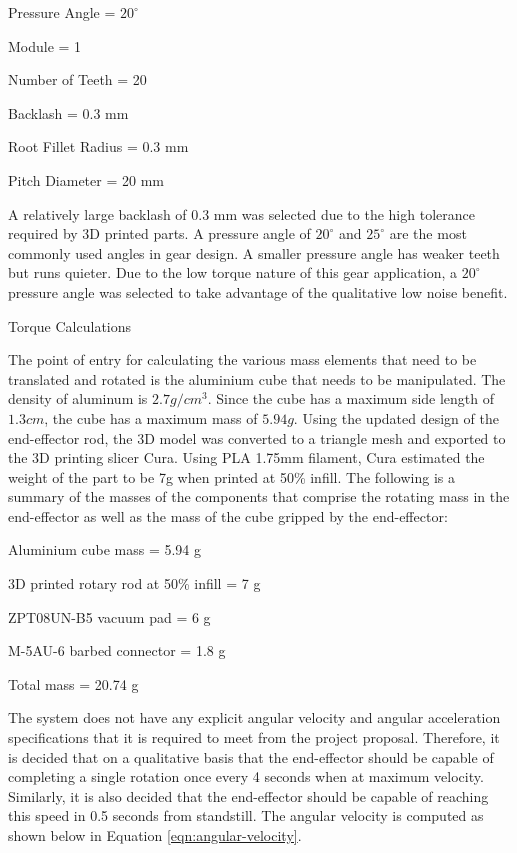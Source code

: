\begin{compactitem}
	\item Pressure Angle = $20 ^\circ$
	\item Module = 1
	\item Number of Teeth = 20
	\item Backlash = 0.3 mm
	\item Root Fillet Radius = 0.3 mm
	\item Pitch Diameter = 20 mm
\end{compactitem}

A relatively large backlash of 0.3 mm was selected due to the high tolerance required by 3D printed parts. A pressure angle of $20 ^\circ$ and $25 ^\circ$ are the most commonly used angles in gear design. A smaller pressure angle has weaker teeth but runs quieter. Due to the low torque nature of this gear application, a $20 ^\circ$ pressure angle was selected to take advantage of the qualitative low noise benefit.

Torque Calculations

The point of entry for calculating the various mass elements that need to be translated and rotated is the aluminium cube that needs to be manipulated. The density of aluminum is $2.7 g/cm^3$. Since the cube has a maximum side length of $1.3 cm$, the cube has a maximum mass of $5.94 g$. Using the updated design of the end-effector rod, the 3D model was converted to a triangle mesh and exported to the 3D printing slicer Cura. Using PLA 1.75mm filament, Cura estimated the weight of the part to be 7g when printed at 50\% infill. The following is a summary of the masses of the components that comprise the rotating mass in the end-effector as well as the mass of the cube gripped by the end-effector:

\begin{compactitem}
	\item Aluminium cube mass = 5.94 g
	\item 3D printed rotary rod at 50\% infill = 7 g
	\item ZPT08UN-B5 vacuum pad = 6 g
	\item M-5AU-6 barbed connector = 1.8 g
	\item Total mass = 20.74 g
\end{compactitem}

The system does not have any explicit angular velocity and angular acceleration specifications that it is required to meet from the project proposal. Therefore, it is decided that on a qualitative basis that the end-effector should be capable of completing a single rotation once every 4 seconds when at maximum velocity. Similarly, it is also decided that the end-effector should be capable of reaching this speed in 0.5 seconds from standstill. The angular velocity is computed as shown below in Equation \ref{eqn:angular-velocity}.

